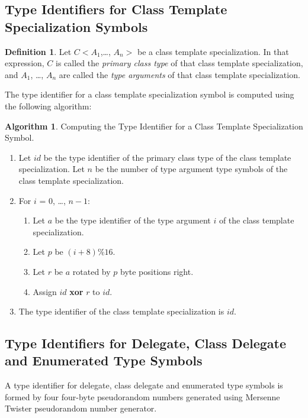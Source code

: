 \documentclass[a4paper,oneside,11pt]{book}
\theoremstyle{definition}
\newtheorem{algo}{Algorithm}[section]
\newtheorem{defn}{Definition}[section]
\begin{document}
\subsection{Type Identifiers for Class Template Specialization Symbols}

\begin{defn}\label{primaryclasstype} Let $C<A_1$,\ldots, $A_n>$ be a class template specialization.
In that expression, $C$ is called the \emph{primary class type} of that class template specialization,
and $A_1$, \ldots, $A_n$ are called the \emph{type arguments} of that class template specialization.
\end{defn}

The type identifier for a class template specialization symbol is computed using the following algorithm:

\begin{algo}\label{templatetypeid} Computing the Type Identifier for a Class Template Specialization Symbol.
\begin{enumerate}
\item
Let $id$ be the type identifier of the primary class type of the class template specialization.
Let $n$ be the number of type argument type symbols of the class template specialization.
\item
For $i$ = 0, \ldots, $n - 1$:
\begin{enumerate}
\item
Let $a$ be the type identifier of the type argument $i$ of the class template specialization.
\item
Let $p$ be $(i + 8) \% 16$.
\item
Let $r$ be $a$ rotated by $p$ byte positions right.
\item
Assign $id$ \textbf{xor} $r$ to $id$.
\end{enumerate}
\item
The type identifier of the class template specialization is $id$.
\end{enumerate}
\end{algo}

\subsection{Type Identifiers for Delegate, Class Delegate and Enumerated Type Symbols}

A type identifier for delegate, class delegate and enumerated type symbols is formed by four
four-byte pseudorandom numbers generated using Mersenne Twister pseudorandom number generator.
\end{document}
